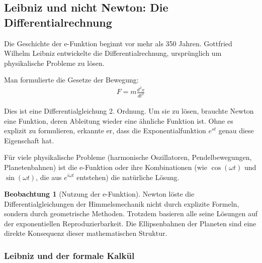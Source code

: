 \documentclass[a4paper, 12pt, twoside, openright]{report}
\theoremstyle{definition}
\newtheorem{beobachtung}{Beobachtung}
\theoremstyle{definition}
\begin{document}
\subsection{Leibniz und nicht Newton: Die Differentialrechnung}

Die Geschichte der e-Funktion beginnt vor mehr als 350 Jahren. Gottfried Wilhelm Leibniz entwickelte die Differentialrechnung, ursprünglich um physikalische Probleme zu lösen.

Man formulierte die Gesetze der Bewegung:
\begin{align}
	F = m \frac{d^2 x}{dt^2}
\end{align}

Dies ist eine Differentialgleichung 2. Ordnung. Um sie zu lösen, brauchte Newton eine Funktion, deren Ableitung wieder eine ähnliche Funktion ist. Ohne es explizit zu formulieren, erkannte er, dass die Exponentialfunktion $e^{st}$ genau diese Eigenschaft hat.

Für viele physikalische Probleme (harmonische Oszillatoren, Pendelbewegungen, Planetenbahnen) ist die e-Funktion oder ihre Kombinationen (wie $\cos(\omega t)$ und $\sin(\omega t)$, die aus $e^{i\omega t}$ entstehen) die natürliche Lösung.

\begin{beobachtung}[Nutzung der e-Funktion]
	Newton löste die Differentialgleichungen der Himmelsmechanik nicht durch explizite Formeln, sondern durch geometrische Methoden. Trotzdem basieren alle seine Lösungen auf der exponentiellen Reproduzierbarkeit. Die Ellipsenbahnen der Planeten sind eine direkte Konsequenz dieser mathematischen Struktur.
\end{beobachtung}

\subsubsection*{Leibniz und der formale Kalkül}
\end{document}
